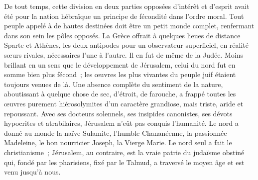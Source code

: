 \documentclass[french,twoside]{book} %
\begin{document}
De tout temps, cette division en deux parties opposées d’intérêt et d’esprit avait été pour la nation hébraïque un principe de fécondité dans l’ordre moral. Tout peuple appelé à de hautes destinées doit être un petit monde complet, renfermant dans son sein les pôles opposés. La Grèce offrait à quelques lieues de distance Sparte et Athènes, les deux antipodes pour un observateur superficiel, en réalité sœurs rivales, nécessaires l’une à l’autre. Il en fut de même de la Judée. Moins brillant en un sens que le développement de Jérusalem, celui du nord fut en somme bien plus fécond ; les œuvres les plus vivantes du peuple juif étaient toujours venues de là. Une absence complète du sentiment de la nature, aboutissant à quelque chose de sec, d’étroit, de farouche, a frappé toutes les œuvres purement hiérosolymites d’un caractère grandiose, mais triste, aride et repoussant. Avec ses docteurs solennels, ses insipides canonistes, ses dévots hypocrites et atrabilaires, Jérusalem n’eût pas conquis l’humanité. Le nord a donné au monde la naïve Sulamite, l’humble Chananéenne, la passionnée Madeleine, le bon nourricier Joseph, la Vierge Marie. Le nord seul a fait le christianisme ; Jérusalem, au contraire, est la vraie patrie du judaïsme obstiné qui, fondé par les pharisiens, fixé par le Talmud, a traversé le moyen âge et est venu jusqu’à nous.\par
\end{document}
